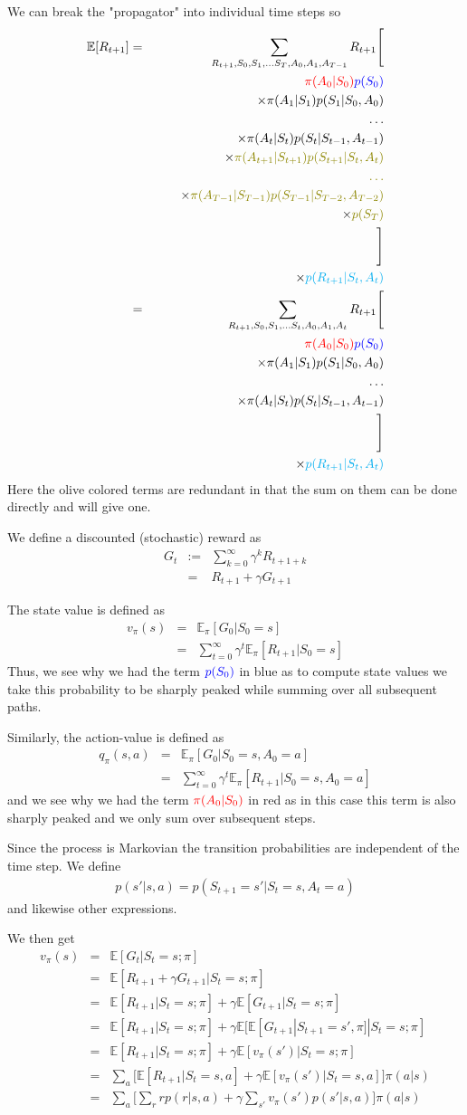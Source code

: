 \documentclass[11pt,a4paper]{article}
\newcommand\bea{\begin{eqnarray}}
\newcommand\eea{\end{eqnarray}}
\newcommand{\nn}{\nonumber \\}
\newcommand{\e}[1]{\mathbb E[#1]}
\begin{document}
We can break the "propagator" into individual time steps so
\bea
\mathbb E[ R_{t+1}] &=& \sum_{R_{t+1}, S_0, S_1, \dots S_T, A_0,A_1, A_{T-1}} R_{t+1} \Bigg[ \nn
&& \qquad \color{red}{\pi(A_0|S_0)} \color{blue}{p(S_0)} \nn
&& \qquad \times \pi(A_{1}|S_{1}) p(S_{1}|S_0,A_0) \nn
&& \qquad \qquad \dots \nn
&&  \qquad \times \pi(A_{t}|S_{t}) p(S_{t}|S_{t-1},A_{t-1}) \nn
&& \qquad \times {\color{olive} \pi(A_{t+1}|S_{t+1}) p(S_{t+1}|S_{t},A_{t}) } \nn
&& \qquad \qquad {\color{olive} \dots} \nn
&& \qquad \times {\color{olive} \pi(A_{T-1}|S_{T-1}) p(S_{T-1}|S_{T-2},A_{T-2}) } \nn
&& \qquad \times {\color{olive} p(S_T)} \nn
&& \Bigg]  \nn
&& \times{\color{cyan} p(R_{t+1}| S_{t},A_{t})} \nn
&=& \sum_{R_{t+1}, S_0, S_1, \dots S_t, A_0,A_1, A_{t}} R_{t+1} \Bigg[ \nn
&& \qquad \color{red}{\pi(A_0|S_0)} \color{blue}{p(S_0)} \nn
&& \qquad \times \pi(A_{1}|S_{1}) p(S_{1}|S_0,A_0) \nn
&& \qquad \qquad \dots \nn
&&  \qquad \times \pi(A_{t}|S_{t}) p(S_{t}|S_{t-1},A_{t-1}) \nn
&& \Bigg]  \nn
&& \times{\color{cyan} p(R_{t+1}| S_{t},A_{t})}
\eea
Here the olive colored terms are redundant in that the sum on them can be done directly and will give one. 

We define a discounted (stochastic) reward as
\bea
G_t &:=& \sum_{k=0}^\infty \gamma^k R_{t+1+k} \nn
&=& R_{t+1} + \gamma G_{t+1}
\eea

The state value is defined as
\bea
v_\pi(s) &=& \mathbb E_\pi[G_0|S_0=s] \nn
&=& \sum_{t=0}^\infty \gamma^t \mathbb E_\pi[R_{t+1} |S_0=s]
\eea
Thus, we see why we had the term $\color{blue}{p(S_0)}$ in blue as to compute state values we take this probability to be sharply peaked while summing over all subsequent paths.

Similarly, the action-value is defined as 
\bea
q_\pi(s,a) &=& \mathbb E_\pi[G_0|S_0=s,A_0=a] \nn
&=& \sum_{t=0}^\infty \gamma^t \mathbb E_\pi[R_{t+1} |S_0=s,A_0=a]
\eea
and we see why we had the term $\color{red}{\pi(A_0|S_0)}$ in red as in this case this term is also sharply peaked and we only sum over subsequent steps. 

Since the process is Markovian the transition probabilities are independent of the time step. We define
\bea
p(s'|s,a) = p(S_{t+1}=s'|S_t=s,A_t=a)
\eea
and likewise other expressions.

We then get
\bea
v_\pi(s) &=& \e{G_t|S_t=s;\pi} \nn
&=& \e{R_{t+1} + \gamma G_{t+1} |S_t=s;\pi} \nn
&=& \e{R_{t+1}|S_t=s;\pi} + \gamma \e{G_{t+1}|S_t=s;\pi} \nn
&=& \e{R_{t+1}|S_t=s;\pi} + \gamma \e{\e{G_{t+1}|S_{t+1}=s',\pi}|S_t=s;\pi}  \nn
&=& \e{R_{t+1}|S_t=s;\pi} + \gamma \e{v_\pi(s') |S_t=s;\pi} \nn
&=& \sum_a \Bigg[\e{R_{t+1}|S_t=s,a} + \gamma \e{v_\pi(s') |S_t=s,a} \Bigg] \pi(a|s) \nn
&=& \sum_a \Bigg[\sum_r r p(r|s,a) + \gamma \sum_{s'} v_\pi(s') p(s'|s,a) \Bigg] \pi(a|s) 
\eea
\end{document}
